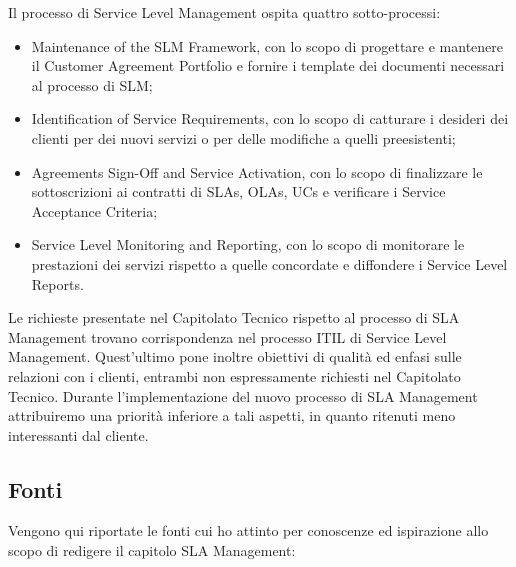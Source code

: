 Il processo di Service Level Management ospita quattro sotto-processi:

\begin{itemize}
	\item Maintenance of the SLM Framework, con lo scopo di progettare e mantenere il Customer Agreement Portfolio e fornire i template dei documenti necessari al processo di SLM;
    \item Identification of Service Requirements, con lo scopo di catturare i desideri dei clienti per dei nuovi servizi o per delle modifiche a quelli preesistenti;
    \item Agreements Sign-Off and Service Activation, con lo scopo di finalizzare le sottoscrizioni ai contratti di SLAs, OLAs, UCs e verificare i Service Acceptance Criteria;
    \item Service Level Monitoring and Reporting, con lo scopo di monitorare le prestazioni dei servizi rispetto a quelle concordate e diffondere i Service Level Reports.
\end{itemize}

Le richieste presentate nel Capitolato Tecnico rispetto al processo di SLA Management trovano corrispondenza nel processo ITIL di Service Level Management. Quest'ultimo pone inoltre obiettivi di qualità ed enfasi sulle relazioni con i clienti, entrambi non espressamente richiesti nel Capitolato Tecnico. Durante l'implementazione del nuovo processo di SLA Management attribuiremo una priorità inferiore a tali aspetti, in quanto ritenuti meno interessanti dal cliente.

\subsection{Fonti}

Vengono qui riportate le fonti cui ho attinto per conoscenze ed ispirazione allo scopo di redigere il capitolo SLA Management:

